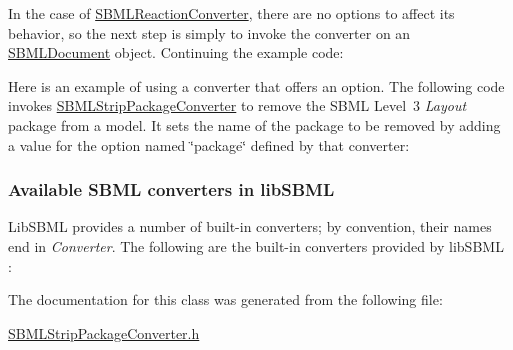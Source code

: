 In the case of \hyperlink{class_s_b_m_l_reaction_converter}{S\+B\+M\+L\+Reaction\+Converter}, there are no options to affect its behavior, so the next step is simply to invoke the converter on an \hyperlink{class_s_b_m_l_document}{S\+B\+M\+L\+Document} object. Continuing the example code\+:

Here is an example of using a converter that offers an option. The following code invokes \hyperlink{class_s_b_m_l_strip_package_converter}{S\+B\+M\+L\+Strip\+Package\+Converter} to remove the S\+B\+ML Level~3 {\itshape Layout} package from a model. It sets the name of the package to be removed by adding a value for the option named {\ttfamily \char`\"{}package\char`\"{}} defined by that converter\+:\hypertarget{classdoc__section__using__sbml__converters_available-converters}{}\subsubsection{Available S\+B\+M\+L converters in lib\+S\+B\+ML}\label{classdoc__section__using__sbml__converters_available-converters}
Lib\+S\+B\+ML provides a number of built-\/in converters; by convention, their names end in {\itshape Converter}. The following are the built-\/in converters provided by lib\+S\+B\+ML \+:

The documentation for this class was generated from the following file\+:\begin{DoxyCompactItemize}
\item 
\hyperlink{_s_b_m_l_strip_package_converter_8h}{S\+B\+M\+L\+Strip\+Package\+Converter.\+h}\end{DoxyCompactItemize}
